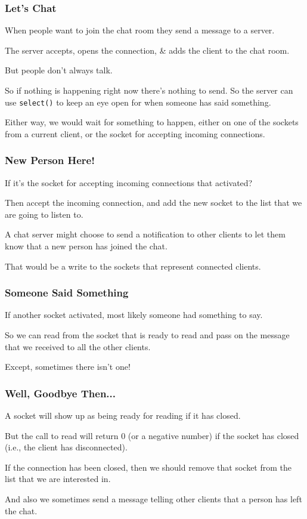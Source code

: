 \begin{frame}
	\frametitle{Let's Chat}

	When people want to join the chat room they send a message to a server.

	The server accepts, opens the connection, \& adds the client to the chat room.

	But people don't always talk.

	So if nothing is happening right now there's nothing to send. So the server can use \texttt{select()} to keep an eye open for when someone has said something.

	Either way, we would wait for something to happen, either on one of the sockets from a current client, or the socket for accepting incoming connections.

\end{frame}

\begin{frame}
	\frametitle{New Person Here!}

	If it's the socket for accepting incoming connections that activated?

	Then accept the incoming connection, and add the new socket to the list that we are going to listen to.

	A chat server might choose to send a notification to other clients to let them know that a new person has joined the chat.

	That would be a write to the sockets that represent connected clients.

\end{frame}

\begin{frame}
	\frametitle{Someone Said Something}

	If another socket activated, most likely someone had something to say.

	So we can read from the socket that is ready to read and pass on the message that we received to all the other clients.

	Except, sometimes there isn't one!

\end{frame}

\begin{frame}
	\frametitle{Well, Goodbye Then...}

	A socket will show up as being ready for reading if it has closed.

	But the call to read will return 0 (or a negative number) if the socket has closed (i.e., the client has disconnected).

	If the connection has been closed, then we should remove that socket from the list that we are interested in.

	And also we sometimes send a message telling other clients that a person has left the chat.

\end{frame}


